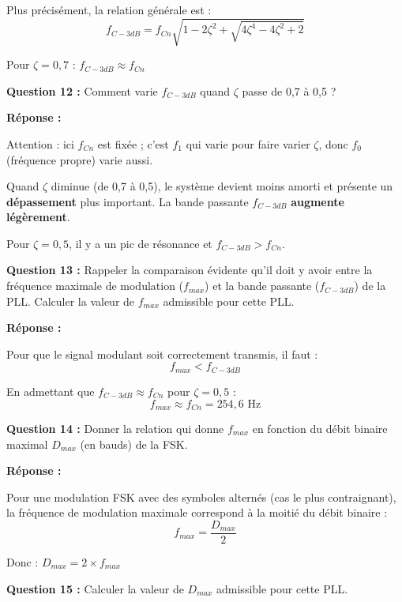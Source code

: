 \documentclass[a4paper,11pt]{article}
\begin{document}
Plus précisément, la relation générale est :
\[
f_{C-3dB} = f_{Cn} \sqrt{1 - 2\zeta^2 + \sqrt{4\zeta^4 - 4\zeta^2 + 2}}
\]

Pour $\zeta = 0{,}7$ : $f_{C-3dB} \approx f_{Cn}$

\vspace{0.5cm}
\textbf{Question 12 :} Comment varie $f_{C-3dB}$ quand $\zeta$ passe de 0,7 à 0,5 ?

\vspace{0.3cm}
\textbf{Réponse :}

Attention : ici $f_{Cn}$ est fixée ; c'est $f_1$ qui varie pour faire varier $\zeta$, donc $f_0$ (fréquence propre) varie aussi.

Quand $\zeta$ diminue (de 0,7 à 0,5), le système devient moins amorti et présente un \textbf{dépassement} plus important. La bande passante $f_{C-3dB}$ \textbf{augmente légèrement}.

Pour $\zeta = 0{,}5$, il y a un pic de résonance et $f_{C-3dB} > f_{Cn}$.

\vspace{0.5cm}
\textbf{Question 13 :} Rappeler la comparaison évidente qu'il doit y avoir entre la fréquence maximale de modulation ($f_{max}$) et la bande passante ($f_{C-3dB}$) de la PLL. Calculer la valeur de $f_{max}$ admissible pour cette PLL.

\vspace{0.3cm}
\textbf{Réponse :}

Pour que le signal modulant soit correctement transmis, il faut :
\[
f_{max} < f_{C-3dB}
\]

En admettant que $f_{C-3dB} \approx f_{Cn}$ pour $\zeta = 0{,}5$ :
\[
f_{max} \approx f_{Cn} = \boxed{254{,}6 \text{ Hz}}
\]

\vspace{0.5cm}
\textbf{Question 14 :} Donner la relation qui donne $f_{max}$ en fonction du débit binaire maximal $D_{max}$ (en bauds) de la FSK.

\vspace{0.3cm}
\textbf{Réponse :}

Pour une modulation FSK avec des symboles alternés (cas le plus contraignant), la fréquence de modulation maximale correspond à la moitié du débit binaire :
\[
f_{max} = \frac{D_{max}}{2}
\]

Donc : $\boxed{D_{max} = 2 \times f_{max}}$

\vspace{0.5cm}
\textbf{Question 15 :} Calculer la valeur de $D_{max}$ admissible pour cette PLL.
\end{document}
